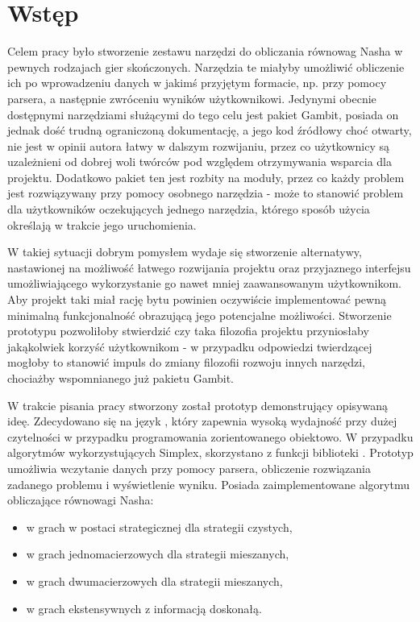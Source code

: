 \documentclass{standalone}
\begin{document}
\pagestyle{headings}

\section*{Wstęp}

Celem pracy było stworzenie zestawu narzędzi do obliczania równowag Nasha w pewnych rodzajach gier skończonych. Narzędzia te miałyby umożliwić
obliczenie ich po wprowadzeniu danych w jakimś przyjętym formacie, np. przy pomocy parsera, a następnie zwróceniu wyników użytkownikowi.
Jedynymi obecnie dostępnymi narzędziami służącymi do tego celu jest pakiet Gambit, posiada on jednak dość trudną ograniczoną dokumentację, a jego
kod źródłowy choć otwarty, nie jest w opinii autora łatwy w dalszym rozwijaniu, przez co użytkownicy są uzależnieni od dobrej woli twórców pod
względem otrzymywania wsparcia dla projektu. Dodatkowo pakiet ten jest rozbity na moduły, przez co każdy problem jest rozwiązywany przy pomocy
osobnego narzędzia - może to stanowić problem dla użytkowników oczekujących jednego narzędzia, którego sposób użycia określają w trakcie jego
uruchomienia.

W takiej sytuacji dobrym pomysłem wydaje się stworzenie alternatywy, nastawionej na możliwość łatwego rozwijania projektu oraz przyjaznego
interfejsu umożliwiającego wykorzystanie go nawet mniej zaawansowanym użytkownikom. Aby projekt taki miał rację bytu powinien oczywiście
implementować pewną minimalną funkcjonalność obrazującą jego potencjalne możliwości. Stworzenie prototypu pozwoliłoby stwierdzić czy taka
filozofia projektu przyniosłaby jakąkolwiek korzyść użytkownikom - w przypadku odpowiedzi twierdzącej mogłoby to stanowić impuls do zmiany
filozofii rozwoju innych narzędzi, chociażby wspomnianego już pakietu Gambit.

W trakcie pisania pracy stworzony został prototyp demonstrujący opisywaną ideę. Zdecydowano się na język , który zapewnia wysoką
wydajność przy dużej czytelności w przypadku programowania zorientowanego obiektowo. W przypadku algorytmów wykorzystujących Simplex, skorzystano
z funkcji biblioteki . Prototyp umożliwia wczytanie danych przy pomocy parsera, obliczenie rozwiązania zadanego problemu i wyświetlenie wyniku.
Posiada zaimplementowane algorytmu obliczające równowagi Nasha:
\begin{itemize}
\item w grach w postaci strategicznej dla strategii czystych,
\item w grach jednomacierzowych dla strategii mieszanych,
\item w grach dwumacierzowych dla strategii mieszanych,
\item w grach ekstensywnych z informacją doskonałą.
\end{itemize}
\end{document}
